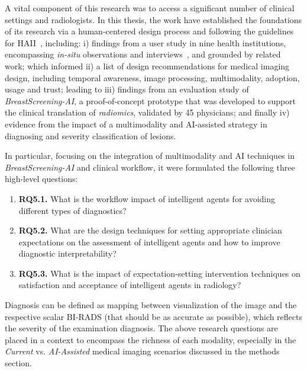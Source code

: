 A vital component of this research was to access a significant number of clinical settings and radiologists.
In this thesis, the work have established the foundations of its research via a human-centered design process and following the guidelines for \ac{HAII}~\cite{10.1145/3290605.3300233, Cai:2019:HTC:3290605.3300234, Kocielnik:2019:YAI:3290605.3300641}, including:
i) findings from a user study in nine health institutions, encompassing {\it in-situ} observations and interviews~\cite{Sarcevic:2012:TET:2240156.2240161, Lim:2019:DDI:3319806.3301427}, and grounded by related work; which informed
ii) a list of design recommendations for medical imaging design, including temporal awareness, image processing, multimodality, adoption, usage and trust; leading to
iii) findings from an evaluation study of {\it BreastScreening-AI}, a proof-of-concept prototype that was developed to support the clinical translation of {\it radiomics}, validated by 45 physicians; and finally
iv) evidence from the impact of a multimodality and \ac{AI}-assisted strategy in diagnosing and severity classification of lesions.

\hfill

\noindent
In particular, focusing on the integration of multimodality and \ac{AI} techniques in {\it BreastScreening-AI} and clinical workflow, it were formulated the following three high-level questions:

\begin{enumerate}
\item {\bf RQ5.1.} What is the workflow impact of intelligent agents for avoiding different types of diagnostics?
\item {\bf RQ5.2.} What are the design techniques for setting appropriate clinician expectations on the assessment of intelligent agents and how to improve diagnostic interpretability?
\item {\bf RQ5.3.} What is the impact of expectation-setting intervention techniques on satisfaction and acceptance of intelligent agents in radiology?
\end{enumerate}

\hfill

Diagnosis can be defined as mapping between visualization of the image and the respective scalar BI-RADS (that should be as accurate as possible), which reflects the severity of the examination diagnosis.
The above research questions are placed in a context to encompass the  richness of each modality, especially in the {\it Current} vs. {\it AI-Assisted} medical imaging scenarios discussed in the methods section.

